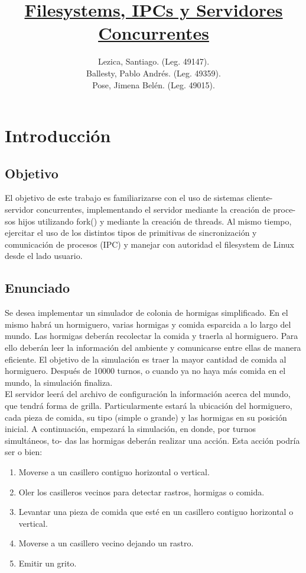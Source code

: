 \documentclass[a4paper,10pt]{article}
\title{\underline{\textbf{Filesystems, IPCs y Servidores Concurrentes}}}
\author{
Lezica, Santiago. (Leg. 49147).\\
Ballesty, Pablo Andrés. (Leg. 49359).\\
Pose, Jimena Belén. (Leg. 49015).\\
}
\date{}
\begin{document}
\maketitle

\newpage
\tableofcontents

\newpage
\section{Introducción}
\subsection{Objetivo}
El objetivo de este trabajo es familiarizarse con el uso de sistemas cliente-
servidor concurrentes, implementando el servidor mediante la creación de proce-
sos hijos utilizando fork() y mediante la creación de threads. Al mismo tiempo,
ejercitar el uso de los distintos tipos de primitivas de sincronización y comunicación
de procesos (IPC) y manejar con autoridad el filesystem de Linux desde
el lado usuario.

\subsection{Enunciado}
Se desea implementar un simulador de colonia de hormigas simplificado. En
el mismo habrá un hormiguero, varias hormigas y comida esparcida a lo largo
del mundo. Las hormigas deberán recolectar la comida y traerla al hormiguero.
Para ello deberán leer la información del ambiente y comunicarse entre ellas
de manera eficiente. El objetivo de la simulación es traer la mayor cantidad
de comida al hormiguero. Después de 10000 turnos, o cuando ya no haya más
comida en el mundo, la simulación finaliza.\\
El servidor leerá del archivo de configuración la información acerca del mundo,
que tendrá forma de grilla. Particularmente estará la ubicación del hormiguero,
cada pieza de comida, su tipo (simple o grande) y las hormigas en su posición inicial.
A continuación, empezará la simulación, en donde, por turnos simultáneos, to-
das las hormigas deberán realizar una acción. Esta acción podría ser o bien:

\begin{enumerate}
 \item Moverse a un casillero contiguo horizontal o vertical.
 \item Oler los casilleros vecinos para detectar rastros, hormigas o comida.
 \item Levantar una pieza de comida que esté en un casillero contiguo horizontal o vertical.
 \item Moverse a un casillero vecino dejando un rastro.
 \item Emitir un grito.
\end{enumerate}
\end{document}
